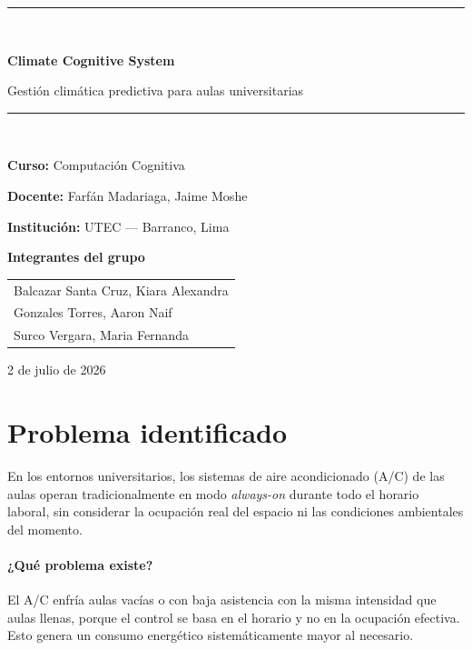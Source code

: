 \documentclass[11pt,a4paper]{article}
\begin{document}
\begin{titlepage}
\centering
\vspace*{2.2cm}
{\color{ccsblue}\rule{\linewidth}{2pt}}\\[0.6cm]
{\Huge\bfseries\color{ccsdark} Climate Cognitive System\par}
\vspace{0.3cm}
{\Large Gestión climática predictiva para aulas universitarias\par}
{\color{ccsblue}\rule{\linewidth}{2pt}}\\[1.4cm]

{\large\textbf{Curso:} Computación Cognitiva\par}
{\large\textbf{Docente:} Farfán Madariaga, Jaime Moshe\par}
{\large\textbf{Institución:} UTEC --- Barranco, Lima\par}
\vspace{1.2cm}

{\large\textbf{Integrantes del grupo}\par}
\vspace{0.3cm}
\begin{tabular}{l}
\textcolor{ccsgray}{Balcazar Santa Cruz, Kiara Alexandra} \\
\textcolor{ccsgray}{Gonzales Torres, Aaron Naif} \\
\textcolor{ccsgray}{Surco Vergara, Maria Fernanda} \\
\end{tabular}

\vfill
{\large 2 de julio de 2026\par}
\end{titlepage}

\tableofcontents
\newpage

\section{Problema identificado}

En los entornos universitarios, los sistemas de aire acondicionado (A/C) de las
aulas operan tradicionalmente en modo \emph{always-on} durante todo el horario
laboral, sin considerar la ocupación real del espacio ni las condiciones
ambientales del momento.

\paragraph{¿Qué problema existe?} El A/C enfría aulas vacías o con baja
asistencia con la misma intensidad que aulas llenas, porque el control se basa
en el horario y no en la ocupación efectiva. Esto genera un consumo energético
sistemáticamente mayor al necesario.
\end{document}
